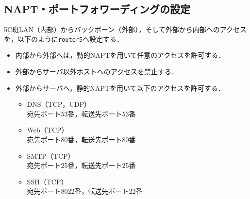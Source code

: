 \subsection{NAPT・ポートフォワーディングの設定}
5C班LAN（内部）からバックボーン（外部），そして外部から内部へのアクセスを，以下のように\texttt{router5}へ設定する．
\begin{itemize}
    \item 内部から外部へは，動的NAPTを用いて任意のアクセスを許可する．
    \item 外部からサーバ以外ホストへのアクセスを禁止する．
    \item 外部からサーバへ，静的NAPTを用いて以下のアクセスを許可する．
          \begin{multicols}{2}
              \begin{itemize}
                  \item DNS（TCP，UDP）\\宛先ポート53番，転送先ポート53番
                  \item Web（TCP）\\宛先ポート80番，転送先ポート80番
                  \item SMTP（TCP）\\宛先ポート25番，転送先ポート25番
                  \item SSH（TCP）\\宛先ポート8022番，転送先ポート22番
              \end{itemize}
          \end{multicols}
\end{itemize}
